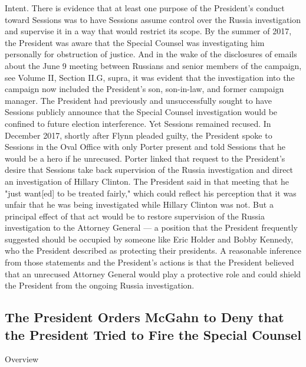 Intent.
There is evidence that at least one purpose of the President's conduct toward Sessions was to have Sessions assume control over the Russia investigation and supervise it in a way that would restrict its scope.
By the summer of 2017, the President was aware that the Special Counsel was investigating him personally for obstruction of justice.
And in the wake of the disclosures of emails about the June 9 meeting between Russians and senior members of the campaign, see Volume II, Section II.G, supra, it was evident that the investigation into the campaign now included the President's son, son-in-law, and former campaign manager.
The President had previously and unsuccessfully sought to have Sessions publicly announce that the Special Counsel investigation would be confined to future election interference.
Yet Sessions remained recused.
In December 2017, shortly after Flynn pleaded guilty, the President spoke to Sessions in the Oval Office with only Porter present and told Sessions that he would be a hero if he unrecused.
Porter linked that request to the President's desire that Sessions take back supervision of the Russia investigation and direct an investigation of Hillary Clinton.
The President said in that meeting that he "just want[ed] to be treated fairly," which could reflect his perception that it was unfair that he was being investigated while Hillary Clinton was not.
But a principal effect of that act would be to restore supervision of the Russia investigation to the
Attorney General — a position that the President frequently suggested should be occupied by someone like Eric Holder and Bobby Kennedy, who the President described as protecting their presidents.
A reasonable inference from those statements and the President's actions is that the President believed that an unrecused Attorney General would play a protective role and could shield the President from the ongoing Russia investigation.

\subsection{The President Orders McGahn to Deny that the President Tried to Fire the Special Counsel}

Overview

